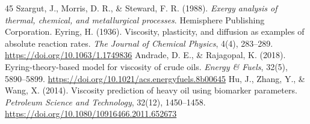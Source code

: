 \documentclass[review,12pt]{elsarticle}
\begin{document}
\begin{thebibliography}{45}
 Szargut, J., Morris, D. R., \& Steward, F. R. (1988). \textit{Exergy analysis of thermal, chemical, and metallurgical processes}. Hemisphere Publishing Corporation.
 Eyring, H. (1936). Viscosity, plasticity, and diffusion as examples of absolute reaction rates. \textit{The Journal of Chemical Physics}, 4(4), 283--289. \url{https://doi.org/10.1063/1.1749836}
 Andrade, D. E., \& Rajagopal, K. (2018). Eyring-theory-based model for viscosity of crude oils. \textit{Energy \& Fuels}, 32(5), 5890--5899. \url{https://doi.org/10.1021/acs.energyfuels.8b00645}
 Hu, J., Zhang, Y., \& Wang, X. (2014). Viscosity prediction of heavy oil using biomarker parameters. \textit{Petroleum Science and Technology}, 32(12), 1450--1458. \url{https://doi.org/10.1080/10916466.2011.652673}
\end{thebibliography}
\end{document}
